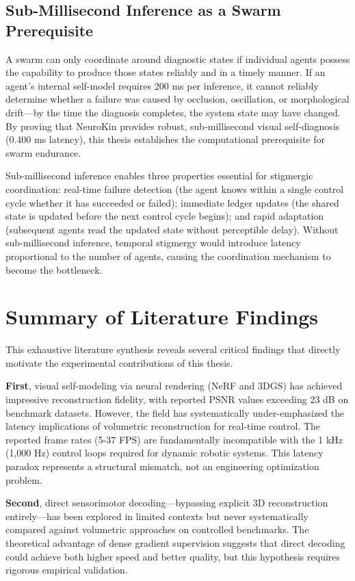 \documentclass[12pt,a4paper,oneside]{report}
\begin{document}
\subsection{Sub-Millisecond Inference as a Swarm Prerequisite}

A swarm can only coordinate around diagnostic states if individual agents possess the capability to produce those states reliably and in a timely manner. If an agent's internal self-model requires 200 ms per inference, it cannot reliably determine whether a failure was caused by occlusion, oscillation, or morphological drift---by the time the diagnosis completes, the system state may have changed. By proving that NeuroKin provides robust, sub-millisecond visual self-diagnosis (0.400 ms latency), this thesis establishes the computational prerequisite for swarm endurance.

Sub-millisecond inference enables three properties essential for stigmergic coordination: real-time failure detection (the agent knows within a single control cycle whether it has succeeded or failed); immediate ledger updates (the shared state is updated before the next control cycle begins); and rapid adaptation (subsequent agents read the updated state without perceptible delay). Without sub-millisecond inference, temporal stigmergy would introduce latency proportional to the number of agents, causing the coordination mechanism to become the bottleneck.

\section{Summary of Literature Findings}

This exhaustive literature synthesis reveals several critical findings that directly motivate the experimental contributions of this thesis.

\textbf{First}, visual self-modeling via neural rendering (NeRF and 3DGS) has achieved impressive reconstruction fidelity, with reported PSNR values exceeding 23 dB on benchmark datasets. However, the field has systematically under-emphasized the latency implications of volumetric reconstruction for real-time control. The reported frame rates (5-37 FPS) are fundamentally incompatible with the 1 kHz (1,000 Hz) control loops required for dynamic robotic systems. This latency paradox represents a structural mismatch, not an engineering optimization problem.

\textbf{Second}, direct sensorimotor decoding---bypassing explicit 3D reconstruction entirely---has been explored in limited contexts but never systematically compared against volumetric approaches on controlled benchmarks. The theoretical advantage of dense gradient supervision suggests that direct decoding could achieve both higher speed and better quality, but this hypothesis requires rigorous empirical validation.
\end{document}
